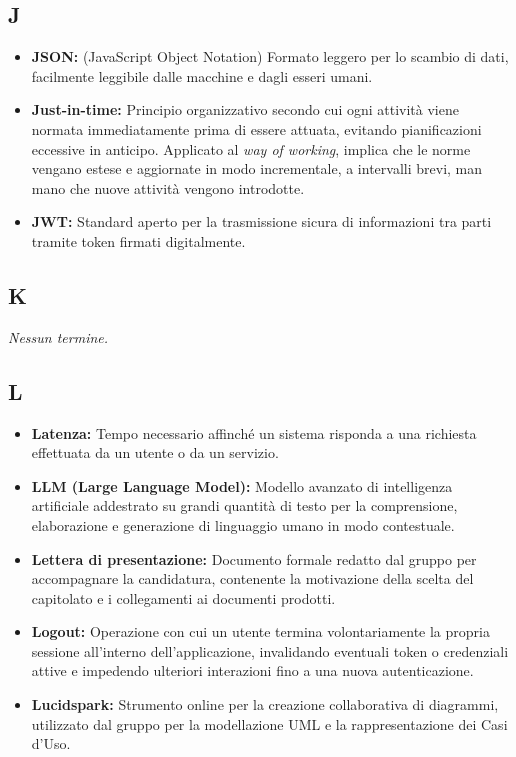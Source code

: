 \subsection*{J}
\begin{itemize}[leftmargin=*]
      \item \textbf{JSON:} (JavaScript Object Notation) Formato leggero per lo scambio di dati, facilmente leggibile dalle macchine e dagli esseri umani.
      \item \textbf{Just-in-time:} Principio organizzativo secondo cui ogni attività
          viene normata immediatamente prima di essere attuata, evitando
          pianificazioni eccessive in anticipo. Applicato al \textit{way of working},
          implica che le norme vengano estese e aggiornate in modo incrementale,
          a intervalli brevi, man mano che nuove attività vengono introdotte.
      \item \textbf{JWT:} Standard aperto per la trasmissione sicura di informazioni tra parti tramite token firmati digitalmente.
\end{itemize}
 
{}
\subsection*{K}
\textit{Nessun termine.}
 
{}
\subsection*{L}
\begin{itemize}[leftmargin=*]
      \item \textbf{Latenza:} Tempo necessario affinché un sistema risponda a una richiesta effettuata da un utente o da un servizio.
      \item \textbf{LLM (Large Language Model):} Modello avanzato di intelligenza
          artificiale addestrato su grandi quantità di testo per la comprensione,
          elaborazione e generazione di linguaggio umano in modo contestuale.
      \item \textbf{Lettera di presentazione:} Documento formale redatto dal gruppo per accompagnare la candidatura, contenente la motivazione della scelta del capitolato e i collegamenti ai documenti prodotti.
      \item \textbf{Logout:} Operazione con cui un utente termina volontariamente la propria sessione all'interno dell'applicazione, invalidando eventuali token o credenziali attive e impedendo ulteriori interazioni fino a una nuova autenticazione.
      \item \textbf{Lucidspark:} Strumento online per la creazione collaborativa di diagrammi, utilizzato dal gruppo per la modellazione UML e la rappresentazione dei Casi d'Uso.
\end{itemize}
 
